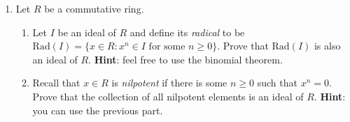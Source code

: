 \documentclass[11pt]{article}
\begin{document}
\begin{enumerate}
\item Let $R$ be a commutative ring.
\begin{enumerate}
\item Let $I$ be an ideal of $R$ and define its \emph{radical} to be $\mathrm{Rad}(I) = \{x \in R\colon x^n \in I \textrm{ for some $n \geq 0$}\}$. Prove that $\mathrm{Rad}(I)$ is also an ideal of $R$. {\bf Hint}: feel free to use the binomial theorem.
\item Recall that $x\in R$ is \emph{nilpotent} if there is some $n \geq 0$ such that $x^n=0$. Prove that the collection of all nilpotent elements is an ideal of $R$. {\bf Hint}: you can use the previous part.
\end{enumerate}



\end{enumerate}
\end{document}
